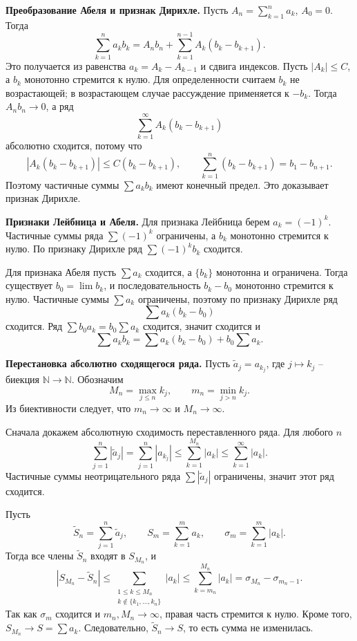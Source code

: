 \documentclass[12pt,a4paper]{article}
\newcommand{\N}{\mathbb{N}}
\begin{document}
\textbf{Преобразование Абеля и признак Дирихле.}
Пусть \(A_n=\sum_{k=1}^{n}a_k\), \(A_0=0\). Тогда
\[
  \sum_{k=1}^{n}a_kb_k
  =
  A_n b_n+\sum_{k=1}^{n-1}A_k(b_k-b_{k+1}).
\]
Это получается из равенства \(a_k=A_k-A_{k-1}\) и сдвига индексов.
Пусть \(|A_k|\le C\), а \(b_k\) монотонно стремится к нулю. Для
определенности считаем \(b_k\) не возрастающей; в возрастающем случае
рассуждение применяется к \(-b_k\). Тогда \(A_n b_n\to0\), а ряд
\[
  \sum_{k=1}^{\infty}A_k(b_k-b_{k+1})
\]
абсолютно сходится, потому что
\[
  |A_k(b_k-b_{k+1})|\le C(b_k-b_{k+1}),\qquad
  \sum_{k=1}^{n}(b_k-b_{k+1})=b_1-b_{n+1}.
\]
Поэтому частичные суммы \(\sum a_kb_k\) имеют конечный предел. Это доказывает
признак Дирихле.

\textbf{Признаки Лейбница и Абеля.}
Для признака Лейбница берем \(a_k=(-1)^k\). Частичные суммы ряда
\(\sum (-1)^k\) ограничены, а \(b_k\) монотонно стремится к нулю. По признаку
Дирихле ряд \(\sum (-1)^k b_k\) сходится.

Для признака Абеля пусть \(\sum a_k\) сходится, а \(\{b_k\}\) монотонна и
ограничена. Тогда существует \(b_0=\lim b_k\), и последовательность
\(b_k-b_0\) монотонно стремится к нулю. Частичные суммы \(\sum a_k\)
ограничены, поэтому по признаку Дирихле ряд
\[
  \sum a_k(b_k-b_0)
\]
сходится. Ряд \(\sum b_0a_k=b_0\sum a_k\) сходится, значит сходится и
\[
  \sum a_kb_k=\sum a_k(b_k-b_0)+b_0\sum a_k.
\]

\textbf{Перестановка абсолютно сходящегося ряда.}
Пусть \(\widetilde a_j=a_{k_j}\), где \(j\mapsto k_j\) -- биекция
\(\N\to\N\). Обозначим
\[
  M_n=\max_{j\le n}k_j,\qquad m_n=\min_{j>n}k_j.
\]
Из биективности следует, что \(m_n\to\infty\) и \(M_n\to\infty\).

Сначала докажем абсолютную сходимость переставленного ряда. Для любого \(n\)
\[
  \sum_{j=1}^{n}|\widetilde a_j|
  =
  \sum_{j=1}^{n}|a_{k_j}|
  \le
  \sum_{k=1}^{M_n}|a_k|
  \le
  \sum_{k=1}^{\infty}|a_k|.
\]
Частичные суммы неотрицательного ряда \(\sum |\widetilde a_j|\) ограничены,
значит этот ряд сходится.

Пусть
\[
  \widetilde S_n=\sum_{j=1}^{n}\widetilde a_j,\qquad
  S_m=\sum_{k=1}^{m}a_k,\qquad
  \sigma_m=\sum_{k=1}^{m}|a_k|.
\]
Тогда все члены \(\widetilde S_n\) входят в \(S_{M_n}\), и
\[
  |S_{M_n}-\widetilde S_n|
  \le
  \sum_{\substack{1\le k\le M_n\\ k\notin\{k_1,\dots,k_n\}}}|a_k|
  \le
  \sum_{k=m_n}^{M_n}|a_k|
  =
  \sigma_{M_n}-\sigma_{m_n-1}.
\]
Так как \(\sigma_m\) сходится и \(m_n,M_n\to\infty\), правая часть стремится к
нулю. Кроме того, \(S_{M_n}\to S=\sum a_k\). Следовательно,
\(\widetilde S_n\to S\), то есть сумма не изменилась.
\end{document}
